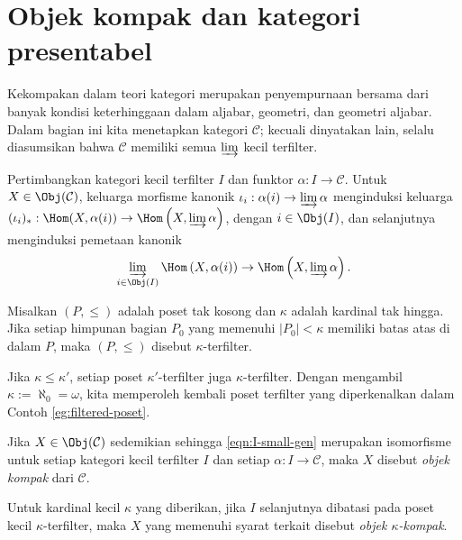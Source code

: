 \section{Objek kompak dan kategori presentabel}\label{sec:cpt-objects}
Kekompakan dalam teori kategori merupakan penyempurnaan bersama dari banyak kondisi keterhinggaan dalam aljabar, geometri, dan geometri aljabar. Dalam bagian ini kita menetapkan kategori $\mathcal{C}$; kecuali dinyatakan lain, selalu diasumsikan bahwa $\mathcal{C}$ memiliki semua $\varinjlim$ kecil terfilter.

Pertimbangkan kategori kecil terfilter $I$ dan funktor $\alpha: I \to \mathcal{C}$. Untuk $X \in \Obj(\mathcal{C})$, keluarga morfisme kanonik $\iota_i: \alpha(i) \to \varinjlim \alpha$ menginduksi keluarga $(\iota_i)_*: \Hom(X, \alpha(i)) \to \Hom\left(X, \varinjlim \alpha \right)$, dengan $i \in \Obj(I)$, dan selanjutnya menginduksi pemetaan kanonik
\begin{equation}\label{eqn:I-small-gen}
	\varinjlim_{i \in \Obj(I)} \Hom\left( X, \alpha(i) \right) \to \Hom\left( X, \varinjlim \alpha \right).
\end{equation}

\begin{definition}\label{def:kappa-filtered}
	Misalkan $(P, \leq)$ adalah poset tak kosong dan $\kappa$ adalah kardinal tak hingga. Jika setiap himpunan bagian $P_0$ yang memenuhi $|P_0| < \kappa$ memiliki batas atas di dalam $P$, maka $(P, \leq)$ disebut $\kappa$-terfilter.
\end{definition}

Jika $\kappa \leq \kappa'$, setiap poset $\kappa'$-terfilter juga
$\kappa$-terfilter. Dengan mengambil $\kappa := \aleph_0 = \omega$, kita
memperoleh kembali poset terfilter yang diperkenalkan dalam
Contoh \ref{eg:filtered-poset}.

\begin{definition}\label{def:cpt-objects}
	Jika $X \in \Obj(\mathcal{C})$ sedemikian sehingga \eqref{eqn:I-small-gen} merupakan isomorfisme untuk setiap kategori kecil terfilter $I$ dan setiap $\alpha: I \to \mathcal{C}$, maka $X$ disebut \emph{objek kompak} dari $\mathcal{C}$.
	
	Untuk kardinal kecil $\kappa$ yang diberikan, jika $I$ selanjutnya dibatasi pada poset kecil $\kappa$-terfilter, maka $X$ yang memenuhi syarat terkait disebut \emph{objek $\kappa$-kompak}.
\end{definition}

